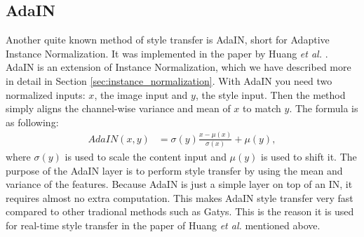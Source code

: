 \subsection{AdaIN}
Another quite known method of style transfer is AdaIN, short for Adaptive Instance Normalization. It was implemented in the paper by Huang \textit{et al.} \cite{Huang:1}. AdaIN is an extension of Instance Normalization, which we have described more in detail in Section \ref{sec:instance_normalization}. With AdaIN you need two normalized inputs: $x$, the image input and $y$, the style input. Then the method simply aligns the channel-wise variance and mean of $x$ to match $y$. The formula is as following: 
\begin{equation}
\begin{aligned}
\label{eq:batch_normalization}
    AdaIN(x,y)&=\sigma(y) \frac{x-\mu(x)}{\sigma(x)}+\mu(y),
\end{aligned}
\end{equation}
where $\sigma(y)$ is used to scale the content input and $\mu(y)$ is used to shift it. The purpose of the AdaIN layer is to perform style transfer by using the mean and variance of the features. Because AdaIN is just a simple layer on top of an IN, it requires almost no extra computation. This makes AdaIN style transfer very fast compared to other tradional methods such as Gatys. This is the reason it is used for real-time style transfer in the paper of Huang \textit{et al.} mentioned above. 